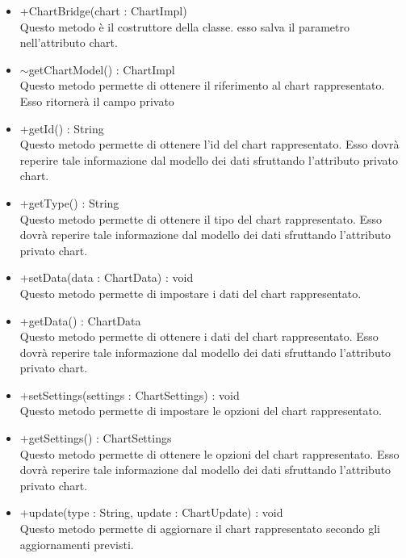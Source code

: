 \begin{itemize}
\begin{itemize}
					\item[\ding{111}] {{+ChartBridge(chart : ChartImpl)}} \\ [1mm] Questo metodo è il costruttore della classe. esso salva il parametro nell'attributo chart.
					\item[\ding{111}] {{\(\sim\)getChartModel() : ChartImpl}} \\ [1mm] Questo metodo permette di ottenere il riferimento al chart rappresentato. Esso ritornerà il campo privato
					\item[\ding{111}] {{+getId() : String}} \\ [1mm] Questo metodo permette di ottenere l'id del chart rappresentato. Esso dovrà reperire tale informazione dal modello dei dati sfruttando l'attributo privato chart.
					\item[\ding{111}] {{+getType() : String}} \\ [1mm] Questo metodo permette di ottenere il tipo del chart rappresentato. Esso dovrà reperire tale informazione dal modello dei dati sfruttando l'attributo privato chart.
					\item[\ding{111}] {{+setData(data : ChartData) : void}} \\ [1mm] Questo metodo permette di impostare i dati del chart rappresentato.
					\item[\ding{111}] {{+getData() : ChartData}} \\ [1mm] Questo metodo permette di ottenere i dati del chart rappresentato. Esso dovrà reperire tale informazione dal modello dei dati sfruttando l'attributo privato chart.
					\item[\ding{111}] {{+setSettings(settings : ChartSettings) : void}} \\ [1mm] Questo metodo permette di impostare le opzioni del chart rappresentato.
					\item[\ding{111}] {{+getSettings() : ChartSettings}} \\ [1mm] Questo metodo permette di ottenere le opzioni del chart rappresentato. Esso dovrà reperire tale informazione dal modello dei dati sfruttando l'attributo privato chart.
					\item[\ding{111}] {{+update(type : String, update : ChartUpdate) : void}} \\ [1mm] Questo metodo permette di aggiornare il chart rappresentato secondo gli aggiornamenti previsti.
				\end{itemize}
		
			\end{itemize}

